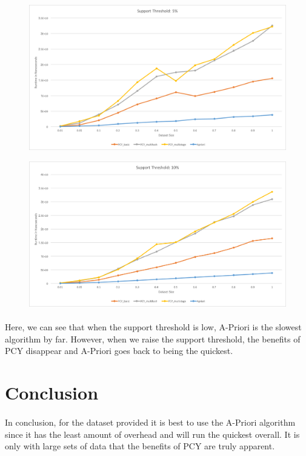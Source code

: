 \documentclass[11pt,letterpaper,titlepage]{article}
\begin{document}
		\begin{figure}[H]
			\includegraphics[width=\textwidth]{st5-big}
		\end{figure}

		\begin{figure}[H]
			\includegraphics[width=\textwidth]{st10-big}
		\end{figure}

		\paragraph{}
			Here, we can see that when the support threshold is low, A-Priori is
			the slowest algorithm by far. However, when we raise the support
			threshold, the benefits of PCY disappear and A-Priori goes back to
			being the quickest.

	\section{Conclusion}
		\paragraph{}
			In conclusion, for the dataset provided it is best to use the
			A-Priori algorithm since it has the least amount of overhead and
			will run the quickest overall. It is only with large sets of data
			that the benefits of PCY are truly apparent.
\end{document}
